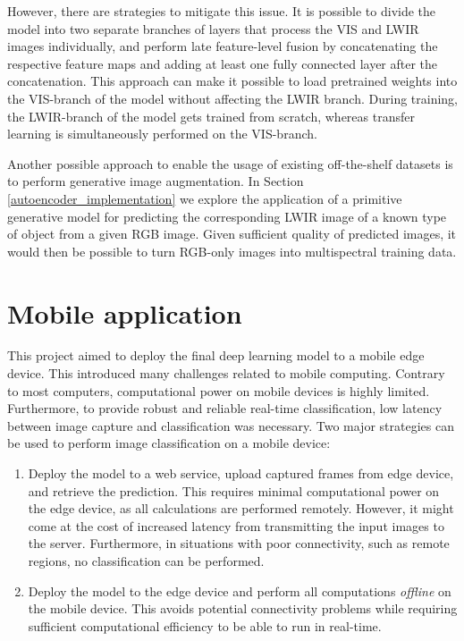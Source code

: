 \documentclass{l4proj}
\begin{document}
However, there are strategies to mitigate this issue. It is possible to divide the model into two separate branches of layers that process the VIS and LWIR images individually, and perform late feature-level fusion \citep{wagner_multispectral_2016, guo_face_2017} by concatenating the respective feature maps and adding at least one fully connected layer after the concatenation. This approach can make it possible to load pretrained weights into the VIS-branch of the model without affecting the LWIR branch. During training, the LWIR-branch of the model gets trained from scratch, whereas transfer learning is simultaneously performed on the VIS-branch.

Another possible approach to enable the usage of existing off-the-shelf datasets is to perform generative image augmentation. In Section \ref{autoencoder_implementation} we explore the application of a primitive generative model for predicting the corresponding LWIR image of a known type of object from a given RGB image. Given sufficient quality of predicted images, it would then be possible to turn RGB-only images into multispectral training data.


\section{Mobile application}
\label{analysis_mobile_application}

This project aimed to deploy the final deep learning model to a mobile edge device. This introduced many challenges related to mobile computing. Contrary to most computers, computational power on mobile devices is highly limited. Furthermore, to provide robust and reliable real-time classification, low latency between image capture and classification was necessary. Two major strategies can be used to perform image classification on a mobile device:

\begin{enumerate}
  \item Deploy the model to a web service, upload captured frames from edge device, and retrieve the prediction. This requires minimal computational power on the edge device, as all calculations are performed remotely. However, it might come at the cost of increased latency from transmitting the input images to the server. Furthermore, in situations with poor connectivity, such as remote regions, no classification can be performed.
  \item Deploy the model to the edge device and perform all computations \textit{offline} on the mobile device. This avoids potential connectivity problems while requiring sufficient computational efficiency to be able to run in real-time.
\end{enumerate}
\end{document}
